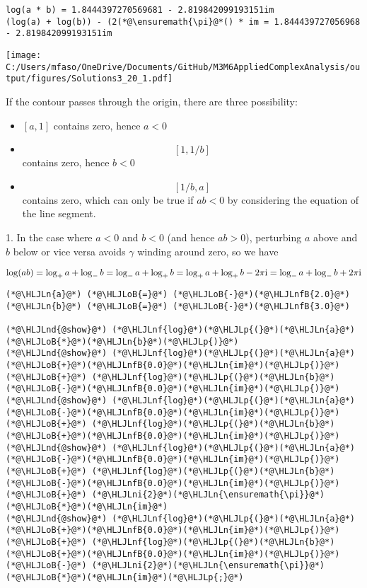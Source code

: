 \documentclass[12pt,landscape]{article}
\newcommand{\HLJLn}[1]{#1}
\newcommand{\HLJLnd}[1]{\textcolor[RGB]{214,102,97}{#1}}
\newcommand{\HLJLnf}[1]{\textcolor[RGB]{66,102,213}{#1}}
\newcommand{\HLJLnfB}[1]{\textcolor[RGB]{59,151,46}{#1}}
\newcommand{\HLJLni}[1]{\textcolor[RGB]{59,151,46}{#1}}
\newcommand{\HLJLoB}[1]{\textcolor[RGB]{102,102,102}{\textbf{#1}}}
\newcommand{\HLJLp}[1]{#1}
\def\I{ {\rm i} }
\begin{document}
{\begin{lstlisting}
log(a * b) = 1.8444397270569681 - 2.819842099193151im
(log(a) + log(b)) - (2(*@\ensuremath{\pi}@*() * im = 1.844439727056968 - 2.819842099193151im
\end{lstlisting}

\texttt{[image: C:/Users/mfaso/OneDrive/Documents/GitHub/M3M6AppliedComplexAnalysis/output/figures/Solutions3\_20\_1.pdf]}

If the contour passes through the origin, there are three possibility:

\begin{itemize}
\item[1. ] $[a,1]$ contains zero, hence $a < 0$


\item[2. ] \[
[1,1/b]
\]
contains zero, hence $b < 0$


\item[3. ] \[
[1/b, a]
\]
contains zero, which can only be true if $a b < 0$ by considering the equation of the line segment.

\end{itemize}
1. In the case where $a < 0$ and $b < 0$ (and hence $a b > 0$), perturbing $a$ above  and $b$ below or vice versa avoids $\gamma$ winding around zero, so we have

\[
\log(a b) = \log_+ a + \log_- b = \log_- a + \log_+ b = \log_+ a + \log_+ b - 2 \pi \I = \log_- a + \log_- b + 2 \pi \I
\]

\begin{lstlisting}
(*@\HLJLn{a}@*) (*@\HLJLoB{=}@*) (*@\HLJLoB{-}@*)(*@\HLJLnfB{2.0}@*)
(*@\HLJLn{b}@*) (*@\HLJLoB{=}@*) (*@\HLJLoB{-}@*)(*@\HLJLnfB{3.0}@*)

(*@\HLJLnd{@show}@*) (*@\HLJLnf{log}@*)(*@\HLJLp{(}@*)(*@\HLJLn{a}@*)(*@\HLJLoB{*}@*)(*@\HLJLn{b}@*)(*@\HLJLp{)}@*)
(*@\HLJLnd{@show}@*) (*@\HLJLnf{log}@*)(*@\HLJLp{(}@*)(*@\HLJLn{a}@*)(*@\HLJLoB{+}@*)(*@\HLJLnfB{0.0}@*)(*@\HLJLn{im}@*)(*@\HLJLp{)}@*) (*@\HLJLoB{+}@*) (*@\HLJLnf{log}@*)(*@\HLJLp{(}@*)(*@\HLJLn{b}@*)(*@\HLJLoB{-}@*)(*@\HLJLnfB{0.0}@*)(*@\HLJLn{im}@*)(*@\HLJLp{)}@*)
(*@\HLJLnd{@show}@*) (*@\HLJLnf{log}@*)(*@\HLJLp{(}@*)(*@\HLJLn{a}@*)(*@\HLJLoB{-}@*)(*@\HLJLnfB{0.0}@*)(*@\HLJLn{im}@*)(*@\HLJLp{)}@*) (*@\HLJLoB{+}@*) (*@\HLJLnf{log}@*)(*@\HLJLp{(}@*)(*@\HLJLn{b}@*)(*@\HLJLoB{+}@*)(*@\HLJLnfB{0.0}@*)(*@\HLJLn{im}@*)(*@\HLJLp{)}@*)
(*@\HLJLnd{@show}@*) (*@\HLJLnf{log}@*)(*@\HLJLp{(}@*)(*@\HLJLn{a}@*)(*@\HLJLoB{-}@*)(*@\HLJLnfB{0.0}@*)(*@\HLJLn{im}@*)(*@\HLJLp{)}@*) (*@\HLJLoB{+}@*) (*@\HLJLnf{log}@*)(*@\HLJLp{(}@*)(*@\HLJLn{b}@*)(*@\HLJLoB{-}@*)(*@\HLJLnfB{0.0}@*)(*@\HLJLn{im}@*)(*@\HLJLp{)}@*) (*@\HLJLoB{+}@*) (*@\HLJLni{2}@*)(*@\HLJLn{\ensuremath{\pi}}@*)(*@\HLJLoB{*}@*)(*@\HLJLn{im}@*)
(*@\HLJLnd{@show}@*) (*@\HLJLnf{log}@*)(*@\HLJLp{(}@*)(*@\HLJLn{a}@*)(*@\HLJLoB{+}@*)(*@\HLJLnfB{0.0}@*)(*@\HLJLn{im}@*)(*@\HLJLp{)}@*) (*@\HLJLoB{+}@*) (*@\HLJLnf{log}@*)(*@\HLJLp{(}@*)(*@\HLJLn{b}@*)(*@\HLJLoB{+}@*)(*@\HLJLnfB{0.0}@*)(*@\HLJLn{im}@*)(*@\HLJLp{)}@*) (*@\HLJLoB{-}@*) (*@\HLJLni{2}@*)(*@\HLJLn{\ensuremath{\pi}}@*)(*@\HLJLoB{*}@*)(*@\HLJLn{im}@*)(*@\HLJLp{;}@*)
\end{lstlisting}

}
\end{document}
